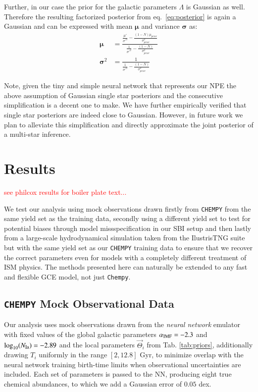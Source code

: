 \documentclass{aa}
\begin{document}
Further, in our case the prior for the galactic parameters $\Lambda$ is Gaussian as well. Therefore the resulting factorized posterior from eq.~\ref{eq:posterior} is again a Gaussian and can be expressed with mean $\mathbf{\mu}$ and variance $\mathbf{\sigma}$ as:
\begin{align}
\mathbf{\mu} &= \frac{\frac{\mu'}{\sigma'^2}-\frac{(1-N)\mu_ {prior}}{\sigma_ {prior}^2}}{\frac1{\sigma'^2}-\frac{(1-N)}{\sigma_ {prior}^2}} \\
\mathbf{\sigma}^2 &= \frac1 {\frac1{\sigma'^2}-\frac{(1-N)}{\sigma_ {prior}^2}}
\end{align}

Note, given the tiny and simple neural network that represents our NPE the above assumption of Gaussian single star posteriors and the consecutive simplification is a decent one to make. We have further empirically verified that single star posteriors are indeed close to Gaussian.
However, in future work we plan to alleviate this simplification and directly approximate the joint posterior of a multi-star inference.


\section{Results}
\label{sec: Results}

\textcolor{red}{see philcox results for boiler plate text...}

We test our analysis using mock observations drawn firstly from \texttt{CHEMPY} from the same yield set as the training data, secondly using a different yield set to test for potential biases through model missspecification in our SBI setup and then lastly from a large-scale hydrodynamical simulation taken from the IlustrisTNG suite \citep{Pillepich2018} but with the same yield set as our \texttt{CHEMPY} training data to ensure that we recover the correct parameters even for models with a completely different treatment of ISM physics. The methods presented here can naturally be extended to any fast and flexible GCE model, not just \texttt{Chempy}.

\subsection{\texttt{CHEMPY} Mock Observational Data}
Our analysis uses mock observations drawn from the \textit{neural network} emulator with fixed values of the global galactic parameters $\alpha_{\rm IMF}=-2.3$ and $\log_{10}(N_{\rm Ia})=-2.89$ and the local parameters $\vec{\Theta}_i$ from Tab. \ref{tab:priors}, additionally drawing $T_i$ uniformly in the range $[2,12.8]$ Gyr, to minimize overlap with the neural network training birth-time limits when observational uncertainties are included. 
Each set of parameters is passed to the NN, producing eight true chemical abundances, to which we add a Gaussian error of $0.05$ dex.
\end{document}
